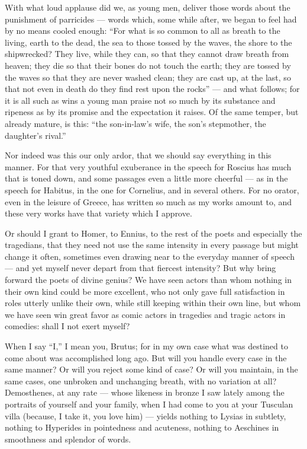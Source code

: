  With what loud applause did we, as young men, deliver those words about the punishment of parricides — words which, some while after, we began to feel had by no means cooled enough: ``For what is so common to all as breath to the living, earth to the dead, the sea to those tossed by the waves, the shore to the shipwrecked? They live, while they can, so that they cannot draw breath from heaven; they die so that their bones do not touch the earth; they are tossed by the waves so that they are never washed clean; they are cast up, at the last, so that not even in death do they find rest upon the rocks'' — and what follows; for it is all such as wins a young man praise not so much by its substance and ripeness as by its promise and the expectation it raises. Of the same temper, but already mature, is this: ``the son-in-law's wife, the son's stepmother, the daughter's rival.''

 Nor indeed was this our only ardor, that we should say everything in this manner. For that very youthful exuberance in the speech for Roscius has much that is toned down, and some passages even a little more cheerful — as in the speech for Habitus, in the one for Cornelius, and in several others. For no orator, even in the leisure of Greece, has written so much as my works amount to, and these very works have that variety which I approve.

 Or should I grant to Homer, to Ennius, to the rest of the poets and especially the tragedians, that they need not use the same intensity in every passage but might change it often, sometimes even drawing near to the everyday manner of speech — and yet myself never depart from that fiercest intensity? But why bring forward the poets of divine genius? We have seen actors than whom nothing in their own kind could be more excellent, who not only gave full satisfaction in roles utterly unlike their own, while still keeping within their own line, but whom we have seen win great favor as comic actors in tragedies and tragic actors in comedies: shall I not exert myself?

 When I say ``I,'' I mean you, Brutus; for in my own case what was destined to come about was accomplished long ago. But will you handle every case in the same manner? Or will you reject some kind of case? Or will you maintain, in the same cases, one unbroken and unchanging breath, with no variation at all? Demosthenes, at any rate — whose likeness in bronze I saw lately among the portraits of yourself and your family, when I had come to you at your Tusculan villa (because, I take it, you love him) — yields nothing to Lysias in subtlety, nothing to Hyperides in pointedness and acuteness, nothing to Aeschines in smoothness and splendor of words.


